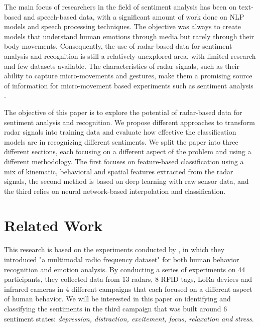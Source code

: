 \documentclass{article}
\begin{document}
The main focus of researchers in the field of sentiment analysis has been on text-based and speech-based data, with a significant amount of work done on NLP models \cite{sentiment2025} and speech processing techniques. The objective was always to create models that understand human emotions through media but rarely through their body movements. Consequently, the use of radar-based data for sentiment analysis and recognition is still a relatively unexplored area, with limited research and few datasets available. The characteristics of radar signals, such as their ability to capture micro-movements and gestures, make them a promising source of information for micro-movement based experiments such as sentiment analysis \cite{radargesture2020}.

The objective of this paper is to explore the potential of radar-based data for sentiment analysis and recognition. We propose different approaches to transform radar signals into training data and evaluate how effective the classification models are in recognizing different sentiments. We split the paper into three different sections, each focusing on a different aspect of the problem and using a different methodology. The first focuses on feature-based classification using a mix of kinematic, behavioral and spatial features extracted from the radar signals, the second method is based on deep learning with raw sensor data, and the third relies on neural network-based interpolation and classification.

\section{Related Work}

This research is based on the experiments conducted by \cite{rfbehavior2025}, in which they introduced "a multimodal radio frequency dataset" for both human behavior recognition and emotion analysis. By conducting a series of experiments on 44 participants, they collected data from 13 radars, 8 RFID tags, LoRa devices and infrared cameras in 4 different campaigns that each focused on a different aspect of human behavior. We will be interested in this paper on identifying and classifying the sentiments in the third campaign that was built around 6 sentiment states: \textit{depression, distraction, excitement, focus, relaxation and stress}.
\end{document}
